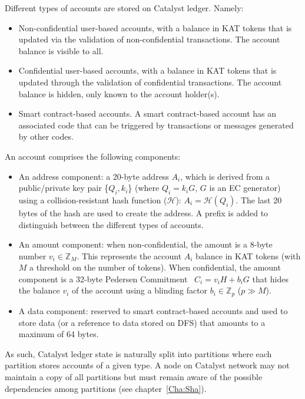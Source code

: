 Different types of accounts are stored on Catalyst ledger. Namely:

\begin{itemize}
\item Non-confidential user-based accounts, with a balance in KAT tokens that is updated via the validation of non-confidential transactions. The account balance is visible to all.
\item Confidential user-based accounts, with a balance in KAT tokens that is updated through the validation of confidential transactions. The account balance is hidden, only known to the account holder(s).
\item Smart contract-based accounts. A smart contract-based account has an associated code that can be triggered by transactions or messages generated by other codes.
\end{itemize}

An account comprises the following components: 

\begin{itemize}
\item An address component: a 20-byte address $A_{i}$, which is derived from a public/private key pair \{$Q_{i},k_{i}$\} (where $Q_i= k_{i}G$, $G$ is an EC generator) using a collision-resistant hash function ($\mathcal{H}$): $A_{i} = \mathcal{H}(Q_{i})$. The last 20 bytes of the hash are used to create the address. A prefix is added to distinguish between the different types of accounts.
\item An amount component: when non-confidential, the amount is a 8-byte number $v_{i} \in \mathbb{Z}_M$. This represents the account $A_{i}$ balance in KAT tokens (with $M$ a threshold on the number of tokens). When confidential, the amount component is a 32-byte Pedersen Commitment~\cite{confidential} $C_{i} = v_{i}H + b_{i}G$ that hides the balance $v_i$ of the account using a blinding factor $b_{i} \in \mathbb{Z}_p$ ($p \gg M$).
\item A data component: reserved to smart contract-based accounts and used to store data (or a reference to data stored on DFS) that amounts to a maximum of 64 bytes. 
\end{itemize}

As such, Catalyst ledger state is naturally split into partitions where each partition stores accounts of a given type. A node on Catalyst network may not maintain a copy of all partitions but must remain aware of the possible dependencies among partitions (see chapter~\ref{Cha:Sha}).\\